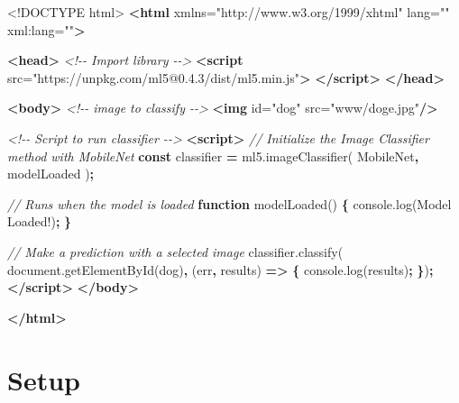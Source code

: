 \documentclass[
]{krantz}
\makeatletter
\newenvironment{Shaded}{\begin{snugshade}}{\end{snugshade}}
\newcommand{\AttributeTok}[1]{\textcolor[rgb]{0.61,0.61,0.61}{#1}}
\newcommand{\CommentTok}[1]{\textcolor[rgb]{0.37,0.37,0.37}{\textit{#1}}}
\newcommand{\DataTypeTok}[1]{\textcolor[rgb]{0.27,0.27,0.27}{#1}}
\newcommand{\KeywordTok}[1]{\textcolor[rgb]{0.27,0.27,0.27}{\textbf{#1}}}
\newcommand{\NormalTok}[1]{#1}
\newcommand{\OperatorTok}[1]{\textcolor[rgb]{0.43,0.43,0.43}{\textbf{#1}}}
\newcommand{\OtherTok}[1]{\textcolor[rgb]{0.37,0.37,0.37}{#1}}
\newcommand{\StringTok}[1]{\textcolor[rgb]{0.5,0.5,0.5}{#1}}
\newcommand{\VariableTok}[1]{\textcolor[rgb]{0,0,0}{#1}}
\newenvironment{kframe}{%
\medskip{}
\setlength{\fboxsep}{.8em}
 \def\at@end@of@kframe{}%
 \ifinner\ifhmode%
  \def\at@end@of@kframe{\end{minipage}}%
  \begin{minipage}{\columnwidth}%
 \fi\fi%
 \def\FrameCommand##1{\hskip\@totalleftmargin \hskip-\fboxsep
 \colorbox{shadecolor}{##1}\hskip-\fboxsep
     \hskip-\linewidth \hskip-\@totalleftmargin \hskip\columnwidth}%
 \MakeFramed {\advance\hsize-\width
   \@totalleftmargin\z@ \linewidth\hsize
   \@setminipage}}%
 {\par\unskip\endMakeFramed%
 \at@end@of@kframe}
\renewenvironment{Shaded}{\begin{kframe}}{\end{kframe}}
\makeatother
\begin{document}
\begin{Shaded}
\begin{Highlighting}[]
\DataTypeTok{<!DOCTYPE }\NormalTok{html}\DataTypeTok{>}
\KeywordTok{<html}\OtherTok{ xmlns=}\StringTok{"http://www.w3.org/1999/xhtml"}\OtherTok{ lang=}\StringTok{""}\OtherTok{ xml:lang=}\StringTok{""}\KeywordTok{>}

\KeywordTok{<head>}
  \CommentTok{<!{-}{-} Import library {-}{-}>}
  \KeywordTok{<script} 
\OtherTok{    src=}\StringTok{"https://unpkg.com/ml5@0.4.3/dist/ml5.min.js"}\KeywordTok{>}
  \KeywordTok{</script>}
\KeywordTok{</head>}

\KeywordTok{<body>}
  \CommentTok{<!{-}{-} image to classify {-}{-}>}
  \KeywordTok{<img}\OtherTok{ id=}\StringTok{"dog"}\OtherTok{ src=}\StringTok{"www/doge.jpg"}\KeywordTok{/>}

  \CommentTok{<!{-}{-} Script to run classifier {-}{-}>}
  \KeywordTok{<script>}
    \CommentTok{// Initialize the Image Classifier method with MobileNet}
    \KeywordTok{const}\NormalTok{ classifier }\OperatorTok{=} \VariableTok{ml5}\NormalTok{.}\AttributeTok{imageClassifier}\NormalTok{(}
      \StringTok{\textquotesingle{}MobileNet\textquotesingle{}}\OperatorTok{,}\NormalTok{ modelLoaded}
\NormalTok{    )}\OperatorTok{;}

    \CommentTok{// Runs when the model is loaded}
    \KeywordTok{function} \AttributeTok{modelLoaded}\NormalTok{() }\OperatorTok{\{}
      \VariableTok{console}\NormalTok{.}\AttributeTok{log}\NormalTok{(}\StringTok{\textquotesingle{}Model Loaded!\textquotesingle{}}\NormalTok{)}\OperatorTok{;}
    \OperatorTok{\}}

    \CommentTok{// Make a prediction with a selected image}
    \VariableTok{classifier}\NormalTok{.}\AttributeTok{classify}\NormalTok{(}
      \VariableTok{document}\NormalTok{.}\AttributeTok{getElementById}\NormalTok{(}\StringTok{\textquotesingle{}dog\textquotesingle{}}\NormalTok{)}\OperatorTok{,}\NormalTok{ (err}\OperatorTok{,}\NormalTok{ results) }\KeywordTok{=>} \OperatorTok{\{}
        \VariableTok{console}\NormalTok{.}\AttributeTok{log}\NormalTok{(results)}\OperatorTok{;}
    \OperatorTok{\}}\NormalTok{)}\OperatorTok{;}
  \KeywordTok{</script>}
\KeywordTok{</body>}

\KeywordTok{</html>}
\end{Highlighting}
\end{Shaded}

\hypertarget{setup}{%
\section{Setup}\label{setup}}
\end{document}
